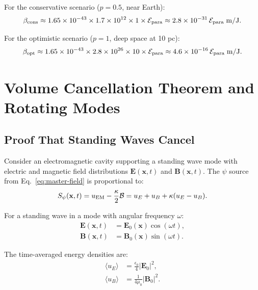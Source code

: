 \documentclass[twocolumn,prl,superscriptaddress,nofootinbib,longbibliography,floatfix]{revtex4-2}
\newcommand{\kap}{\kappa}
\newcommand{\calB}{\mathcal{B}}
\begin{document}
For the conservative scenario ($p = 0.5$, near Earth):
\begin{equation}
\beta_{\rm cons} \approx 1.65 \times 10^{-43} \times 1.7 \times 10^{12}
\times 1 \times \mathcal{E}_{\rm para}
\approx 2.8 \times 10^{-31}\,\mathcal{E}_{\rm para}\;\si{m/J}.
\end{equation}

For the optimistic scenario ($p = 1$, deep space at 10 pc):
\begin{equation}
\beta_{\rm opt} \approx 1.65 \times 10^{-43} \times 2.8 \times 10^{26}
\times 10 \times \mathcal{E}_{\rm para}
\approx 4.6 \times 10^{-16}\,\mathcal{E}_{\rm para}\;\si{m/J}.
\end{equation}

\section{Volume Cancellation Theorem and Rotating Modes}
\label{sec:volume}

\subsection{Proof That Standing Waves Cancel}

Consider an electromagnetic cavity supporting a standing wave mode with
electric and magnetic field distributions $\mathbf{E}(\mathbf{x},t)$
and $\mathbf{B}(\mathbf{x},t)$.  The $\psi$ source from
Eq.~\eqref{eq:master-field} is proportional to:
\begin{equation}
S_\psi(\mathbf{x},t) = u_{\rm EM} - \frac{\kap}{2}\calB
= u_E + u_B + \kap(u_E - u_B).
\label{eq:source-general}
\end{equation}

For a standing wave in a mode with angular frequency $\omega$:
\begin{align}
\mathbf{E}(\mathbf{x},t) &= \mathbf{E}_0(\mathbf{x})\cos(\omega t),
\label{eq:standing-E}\\
\mathbf{B}(\mathbf{x},t) &= \mathbf{B}_0(\mathbf{x})\sin(\omega t).
\label{eq:standing-B}
\end{align}

The time-averaged energy densities are:
\begin{align}
\langle u_E \rangle &= \frac{\epsilon_0}{4}|\mathbf{E}_0|^2, \\
\langle u_B \rangle &= \frac{1}{4\mu_0}|\mathbf{B}_0|^2.
\end{align}
\end{document}

